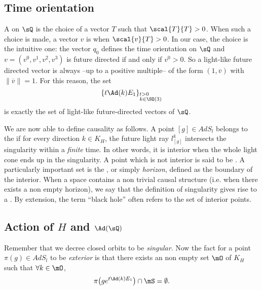 \subsection{Time orientation}

A  on $\sQ$ is the choice of a vector $T$ such that $\scal{T}{T}>0$. When such a choice is made, a vector $v$ is  when $\scal{v}{T}>0$. In our case, the choice is the intuitive one: the vector $q_0$ defines the time orientation on $\sQ$ and $v=(v^0,v^1,v^2,v^3)$ is future directed if and only if $v^0>0$. So a light-like future directed vector is always --up to a positive multiple-- of the form $(1,\overline{v})$ with $\|\overline{v}\|=1$. For this reason, the set
\begin{equation}	\label{EqTousVecLumTy}
  \{t\Ad(k)E_1\}_{%
\begin{subarray}{l}
t>0\\k\in \SO(3)
\end{subarray}
}
\end{equation}
is exactly the set of light-like future-directed vectors of $\sQ$.

We are now able to define causality as follows.  A point $[g]\in AdS_l$ belongs to the  if for every direction $k\in K_H$, the future light ray $l^k_{[g]}$ intersects the singularity within a \emph{finite} time.  In other words, it is interior when the whole light cone ends up in the singularity.  A point which is not interior is said to be . A particularly important set is the , or simply \emph{horizon}, defined as the boundary of the interior. When a space contains a non trivial causal structure (i.e. when there exists a non empty horizon), we say that the definition of singularity gives rise to a .  By extension, the term ``black hole'' often refers to the set of interior points.

\subsection{Action of \texorpdfstring{$H$}{H} and \texorpdfstring{$\Ad(\sQ)$}{AdQ}}

Remember that we decree closed orbits to be \emph{singular}. Now the fact for a point $\pi(g)\in AdS_l$ to be \emph{exterior} is that there exists an non empty set $\mO$ of $K_H$ such that $\forall k\in\mO$,
\[
  \pi\big( g e^{t\Ad(k)E_1}  \big)\cap\mS=\emptyset.
\]

